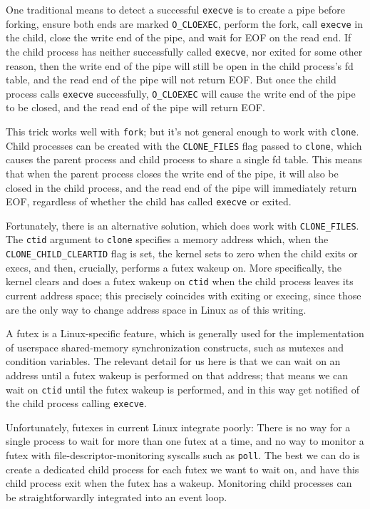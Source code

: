 \documentclass{acmart}
\begin{document}
One traditional means to detect a successful \texttt{execve} is to create a pipe before forking,
ensure both ends are marked \verb|O_CLOEXEC|,
perform the fork,
call \texttt{execve} in the child,
close the write end of the pipe,
and wait for EOF on the read end.
If the child process has neither successfully called \texttt{execve}, nor exited for some other reason,
then the write end of the pipe will still be open in the child process's fd table,
and the read end of the pipe will not return EOF.
But once the child process calls \texttt{execve} successfully,
\verb|O_CLOEXEC| will cause the write end of the pipe to be closed,
and the read end of the pipe will return EOF.

This trick works well with \texttt{fork};
but it's not general enough to work with \texttt{clone}.
Child processes can be created with the \verb|CLONE_FILES| flag passed to \texttt{clone},
which causes the parent process and child process to share a single fd table.
This means that when the parent process closes the write end of the pipe,
it will also be closed in the child process,
and the read end of the pipe will immediately return EOF,
regardless of whether the child has called \texttt{execve} or exited.

Fortunately, there is an alternative solution, which does work with \verb|CLONE_FILES|.
The \texttt{ctid} argument to \texttt{clone} specifies a memory address which,
when the \verb|CLONE_CHILD_CLEARTID| flag is set,
the kernel sets to zero when the child exits or execs,
and then, crucially, performs a futex wakeup on.
More specifically,
the kernel clears and does a futex wakeup on \texttt{ctid} when the child process leaves its current address space;
this precisely coincides with exiting or execing,
since those are the only way to change address space in Linux as of this writing.

A futex is a Linux-specific feature,
which is generally used for the implementation of userspace shared-memory synchronization constructs,
such as mutexes and condition variables.
The relevant detail for us here is that we can wait on an address
until a futex wakeup is performed on that address;
that means we can wait on \texttt{ctid} until the futex wakeup is performed,
and in this way get notified of the child process calling \texttt{execve}.

Unfortunately, futexes in current Linux integrate poorly:
There is no way for a single process to wait for more than one futex at a time,
and no way to monitor a futex with file-descriptor-monitoring syscalls such as \texttt{poll}.
The best we can do is create a dedicated child process for each futex we want to wait on,
and have this child process exit when the futex has a wakeup.
Monitoring child processes can be straightforwardly integrated into an event loop.
\end{document}

